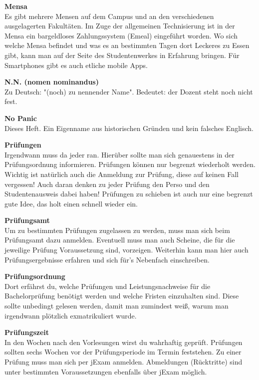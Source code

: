 \textbf{Mensa} \\
Es gibt mehrere Mensen auf dem Campus und an den verschiedenen ausgelagerten Fakultäten.
Im Zuge der allgemeinen Technisierung ist in der Mensa ein bargeldloses Zahlungssystem (Emeal) eingeführt worden.
Wo sich welche Mensa befindet und was es an bestimmten Tagen dort Leckeres zu Essen gibt, kann man auf der Seite des Studentenwerkes in Erfahrung bringen. 
Für Smartphones gibt es auch etliche mobile Apps.

\textbf{N.N. (nomen nominandus)} \\
Zu Deutsch:
"(noch) zu nennender Name".
Bedeutet:
der Dozent steht noch nicht fest.

\textbf{No Panic} \\
Dieses Heft.
Ein Eigenname aus historischen Gründen und kein falsches Englisch.

\textbf{Prüfungen} \\
Irgendwann muss da jeder ran.
Hierüber sollte man sich genauestens in der Prüfungsordnung informieren.
Prüfungen können nur begrenzt wiederholt werden.
Wichtig ist natürlich auch die Anmeldung zur Prüfung, diese auf keinen Fall vergessen!
Auch daran denken zu jeder Prüfung den Perso und den Studentenausweis dabei haben!
Prüfungen zu schieben ist auch nur eine begrenzt gute Idee, das holt einen schnell wieder ein.

\textbf{Prüfungsamt} \\
Um zu bestimmten Prüfungen zugelassen zu werden, muss man sich beim Prüfungsamt dazu anmelden.
Eventuell muss man auch Scheine, die für die jeweilige Prüfung Voraussetzung sind, vorzeigen.
Weiterhin kann man hier auch Prüfungsergebnisse erfahren und sich für's Nebenfach einschreiben.

\textbf{Prüfungsordnung} \\
Dort erfährst du, welche Prüfungen und Leistungsnachweise für die Bachelorprüfung benötigt werden und welche Fristen einzuhalten sind.
Diese sollte unbedingt gelesen werden, damit man zumindest weiß, warum man irgendwann plötzlich exmatrikuliert wurde.

\textbf{Prüfungszeit} \\
In den Wochen nach den Vorlesungen wirst du wahrhaftig geprüft.
Prüfungen sollten sechs Wochen vor der Prüfungsperiode im Termin feststehen.
Zu einer Prüfung muss man sich per jExam anmelden.
Abmeldungen (Rücktritte) sind unter bestimmten Voraussetzungen ebenfalls über jExam möglich.

